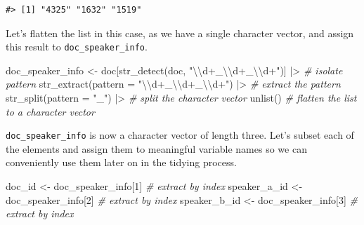 \documentclass[
  letterpaper,
]{scrbook}
\newenvironment{Shaded}{\begin{snugshade}}{\end{snugshade}}
\newcommand{\AttributeTok}[1]{\textcolor[rgb]{0.00,0.00,0.00}{#1}}
\newcommand{\CommentTok}[1]{\textcolor[rgb]{0.00,0.00,0.00}{\textit{#1}}}
\newcommand{\DecValTok}[1]{\textcolor[rgb]{0.00,0.00,0.00}{#1}}
\newcommand{\FunctionTok}[1]{\textcolor[rgb]{0.00,0.00,0.00}{#1}}
\newcommand{\NormalTok}[1]{\textcolor[rgb]{0.00,0.00,0.00}{#1}}
\newcommand{\OtherTok}[1]{\textcolor[rgb]{0.00,0.00,0.00}{#1}}
\newcommand{\SpecialCharTok}[1]{\textcolor[rgb]{0.00,0.00,0.00}{#1}}
\newcommand{\StringTok}[1]{\textcolor[rgb]{0.00,0.00,0.00}{#1}}
\begin{document}
\begin{verbatim}
#> [1] "4325" "1632" "1519"
\end{verbatim}

Let's flatten the list in this case, as we have a single character
vector, and assign this result to \texttt{doc\_speaker\_info}.

\begin{Shaded}
\begin{Highlighting}[]
\NormalTok{doc\_speaker\_info }\OtherTok{\textless{}{-}} 
\NormalTok{  doc[}\FunctionTok{str\_detect}\NormalTok{(doc, }\StringTok{"}\SpecialCharTok{\textbackslash{}\textbackslash{}}\StringTok{d+\_}\SpecialCharTok{\textbackslash{}\textbackslash{}}\StringTok{d+\_}\SpecialCharTok{\textbackslash{}\textbackslash{}}\StringTok{d+"}\NormalTok{)] }\SpecialCharTok{|\textgreater{}} \CommentTok{\# isolate pattern}
  \FunctionTok{str\_extract}\NormalTok{(}\AttributeTok{pattern =} \StringTok{"}\SpecialCharTok{\textbackslash{}\textbackslash{}}\StringTok{d+\_}\SpecialCharTok{\textbackslash{}\textbackslash{}}\StringTok{d+\_}\SpecialCharTok{\textbackslash{}\textbackslash{}}\StringTok{d+"}\NormalTok{) }\SpecialCharTok{|\textgreater{}} \CommentTok{\# extract the pattern}
  \FunctionTok{str\_split}\NormalTok{(}\AttributeTok{pattern =} \StringTok{"\_"}\NormalTok{) }\SpecialCharTok{|\textgreater{}}  \CommentTok{\# split the character vector}
  \FunctionTok{unlist}\NormalTok{() }\CommentTok{\# flatten the list to a character vector}
\end{Highlighting}
\end{Shaded}

\texttt{doc\_speaker\_info} is now a character vector of length three.
Let's subset each of the elements and assign them to meaningful variable
names so we can conveniently use them later on in the tidying process.

\begin{Shaded}
\begin{Highlighting}[]
\NormalTok{doc\_id }\OtherTok{\textless{}{-}}\NormalTok{ doc\_speaker\_info[}\DecValTok{1}\NormalTok{] }\CommentTok{\# extract by index}
\NormalTok{speaker\_a\_id }\OtherTok{\textless{}{-}}\NormalTok{ doc\_speaker\_info[}\DecValTok{2}\NormalTok{] }\CommentTok{\# extract by index}
\NormalTok{speaker\_b\_id }\OtherTok{\textless{}{-}}\NormalTok{ doc\_speaker\_info[}\DecValTok{3}\NormalTok{] }\CommentTok{\# extract by index}
\end{Highlighting}
\end{Shaded}
\end{document}
